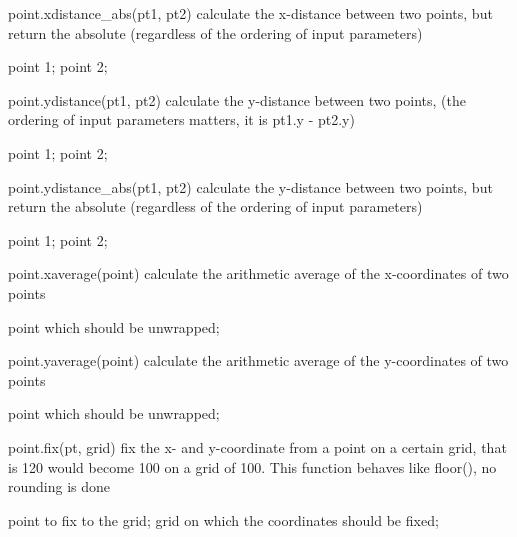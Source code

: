 \begin{APIfunc}{point.xdistance\_abs(pt1, pt2)}
    calculate the x-distance between two points, but return the absolute (regardless of the ordering of input parameters)
    \begin{APIparameters}
            point 1;
            point 2;
    \end{APIparameters}
\end{APIfunc}
\begin{APIfunc}{point.ydistance(pt1, pt2)}
    calculate the y-distance between two points, (the ordering of input parameters matters, it is pt1.y - pt2.y)
    \begin{APIparameters}
            point 1;
            point 2;
    \end{APIparameters}
\end{APIfunc}
\begin{APIfunc}{point.ydistance\_abs(pt1, pt2)}
    calculate the y-distance between two points, but return the absolute (regardless of the ordering of input parameters)
    \begin{APIparameters}
            point 1;
            point 2;
    \end{APIparameters}
\end{APIfunc}
\begin{APIfunc}{point.xaverage(point)}
    calculate the arithmetic average of the x-coordinates of two points
    \begin{APIparameters}
            point which should be unwrapped;
    \end{APIparameters}
\end{APIfunc}
\begin{APIfunc}{point.yaverage(point)}
    calculate the arithmetic average of the y-coordinates of two points
    \begin{APIparameters}
            point which should be unwrapped;
    \end{APIparameters}
\end{APIfunc}
\begin{APIfunc}{point.fix(pt, grid)}
    fix the x- and y-coordinate from a point on a certain grid, that is 120 would become 100 on a grid of 100. This function behaves like floor(), no rounding is done
    \begin{APIparameters}
            point to fix to the grid;
            grid on which the coordinates should be fixed;
    \end{APIparameters}
\end{APIfunc}
